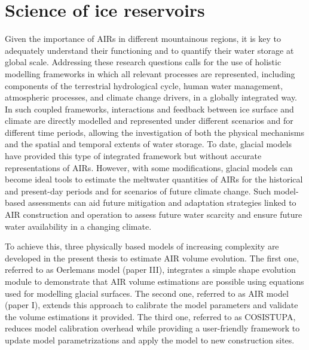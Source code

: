 \chapter{Science of ice reservoirs}
\label{chap:science}


Given the importance of \ac{AIRs} in different mountainous regions, it is key to adequately understand their
functioning and to quantify their water storage at global scale. Addressing these research questions
calls for the use of holistic modelling frameworks in which all relevant processes are represented, including
components of the terrestrial hydrological cycle, human water management, atmospheric processes, and climate
change drivers, in a globally integrated way. In such coupled frameworks, interactions and feedback between
ice surface and climate are directly modelled and represented under different scenarios and for different time
periods, allowing the investigation of both the physical mechanisms and the spatial and temporal extents of water
storage. To date, glacial models have provided this type of integrated framework but without accurate
representations of \ac{AIRs}. However, with some modifications, glacial models can become ideal tools to estimate the
meltwater quantities of \ac{AIRs} for the historical and present-day periods and for scenarios of future
climate change. Such model-based assessments can aid future mitigation and adaptation strategies linked to \ac{AIR}
construction and operation to assess future water scarcity and ensure future water availability in a changing
climate.

To achieve this, three physically based models of increasing complexity are developed in the present thesis to estimate
AIR volume evolution. The first one, referred to as Oerlemans model (paper III), integrates a simple shape
evolution module to demonstrate that \ac{AIR} volume estimations are possible using equations used for modelling
glacial surfaces. The second one, referred to as \ac{AIR} model (paper I), extends this approach to calibrate the
model parameters and validate the volume estimations it provided. The third one, referred to as COSISTUPA,
reduces model calibration overhead while providing a user-friendly framework to update model parametrizations
and apply the model to new construction sites. 

